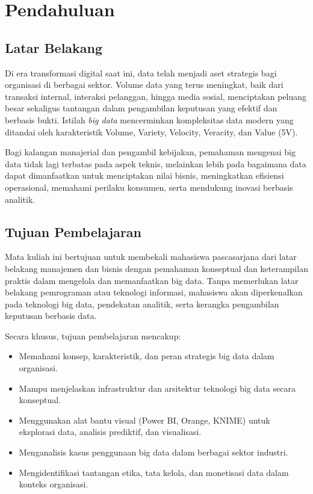\chapter{Pendahuluan}

\section{Latar Belakang}

Di era transformasi digital saat ini, data telah menjadi aset strategis bagi organisasi di berbagai sektor. Volume data yang terus meningkat, baik dari transaksi internal, interaksi pelanggan, hingga media sosial, menciptakan peluang besar sekaligus tantangan dalam pengambilan keputusan yang efektif dan berbasis bukti. Istilah \textit{big data} mencerminkan kompleksitas data modern yang ditandai oleh karakteristik Volume, Variety, Velocity, Veracity, dan Value (5V).

Bagi kalangan manajerial dan pengambil kebijakan, pemahaman mengenai big data tidak lagi terbatas pada aspek teknis, melainkan lebih pada bagaimana data dapat dimanfaatkan untuk menciptakan nilai bisnis, meningkatkan efisiensi operasional, memahami perilaku konsumen, serta mendukung inovasi berbasis analitik.

\section{Tujuan Pembelajaran}

Mata kuliah ini bertujuan untuk membekali mahasiswa pascasarjana dari latar belakang manajemen dan bisnis dengan pemahaman konseptual dan keterampilan praktis dalam mengelola dan memanfaatkan big data. Tanpa memerlukan latar belakang pemrograman atau teknologi informasi, mahasiswa akan diperkenalkan pada teknologi big data, pendekatan analitik, serta kerangka pengambilan keputusan berbasis data.

Secara khusus, tujuan pembelajaran mencakup:

\begin{itemize}
	\item Memahami konsep, karakteristik, dan peran strategis big data dalam organisasi.
	\item Mampu menjelaskan infrastruktur dan arsitektur teknologi big data secara konseptual.
	\item Menggunakan alat bantu visual (Power BI, Orange, KNIME) untuk eksplorasi data, analisis prediktif, dan visualisasi.
	\item Menganalisis kasus penggunaan big data dalam berbagai sektor industri.
	\item Mengidentifikasi tantangan etika, tata kelola, dan monetisasi data dalam konteks organisasi.
\end{itemize}

